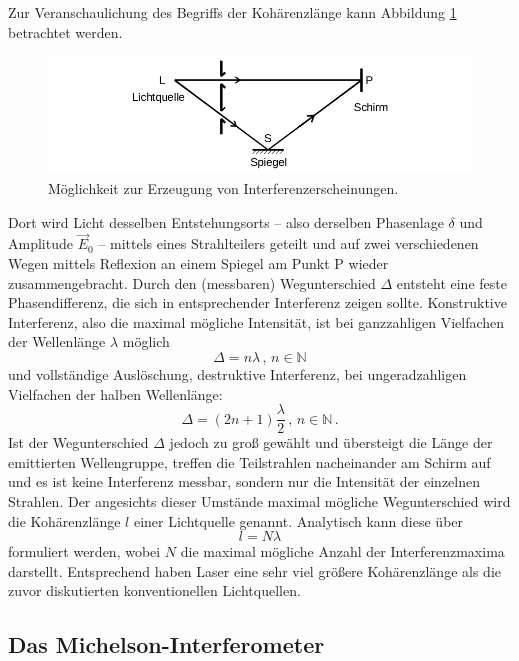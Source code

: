 Zur Veranschaulichung des Begriffs der Kohärenzlänge kann Abbildung \ref{fig:Prinzip} betrachtet werden. 
\begin{figure}
    \centering
    \includegraphics[width=\textwidth]{plots/Interferenz_Prinzip.png}
    \caption{Möglichkeit zur Erzeugung von Interferenzerscheinungen\cite{Versuchsanleitung}.}
    \label{fig:Prinzip}
\end{figure}
Dort wird Licht desselben Entstehungsorts -- also derselben Phasenlage $\delta$ und Amplitude $\vec{E}_0$ -- mittels eines 
Strahlteilers geteilt und auf zwei verschiedenen Wegen mittels Reflexion an einem Spiegel am Punkt P wieder zusammengebracht. 
Durch den (messbaren) Wegunterschied $\Delta$ entsteht eine feste Phasendifferenz, die sich in entsprechender Interferenz zeigen sollte. 
Konstruktive Interferenz, also die maximal mögliche Intensität, ist bei ganzzahligen Vielfachen der Wellenlänge $\lambda$ möglich 
\begin{equation*}
    \Delta = n\lambda \,, \, n \in \mathbb{N}
\end{equation*}
und vollständige Auslöschung, destruktive Interferenz, bei ungeradzahligen Vielfachen der halben Wellenlänge:
\begin{equation*}
    \Delta = (2n+1)\frac{\lambda}{2}\,,\,n\in\mathbb{N}\,.
\end{equation*}
Ist der Wegunterschied $\Delta$ jedoch zu groß gewählt und übersteigt die Länge der emittierten Wellengruppe, treffen 
die Teilstrahlen nacheinander am Schirm auf und es ist keine Interferenz messbar, sondern nur die Intensität der einzelnen 
Strahlen. 
Der angesichts dieser Umstände maximal mögliche Wegunterschied wird die Kohärenzlänge $l$ einer Lichtquelle genannt. 
Analytisch kann diese über 
\begin{equation*}
    l=N\lambda
\end{equation*}
formuliert werden, wobei $N$ die maximal mögliche Anzahl der Interferenzmaxima darstellt\cite{Versuchsanleitung}. 
Entsprechend haben Laser eine sehr viel größere Kohärenzlänge als die zuvor diskutierten konventionellen Lichtquellen. 

\subsection{Das Michelson-Interferometer}

